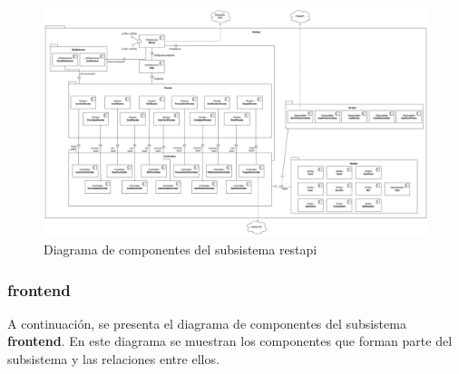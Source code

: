     \begin{landscape}
    \begin{figure}[H]
        \hypertarget{fig:6_5_Diagrama-Componentes-restapi}{}
        \centering
        \includegraphics[width=1\linewidth]{figures/6-Analisis/6-Clases/6_5-Componentes-restapi.png}
        \caption{Diagrama de componentes del subsistema restapi}
        \label{fig:6_5_Diagrama-Componentes-restapi}
    \end{figure}
    \end{landscape}

\newpage





\subsubsection{frontend}
A continuación, se presenta el diagrama de componentes del subsistema \textbf{frontend}. En este diagrama se muestran los componentes que forman parte del subsistema y las relaciones entre ellos.
